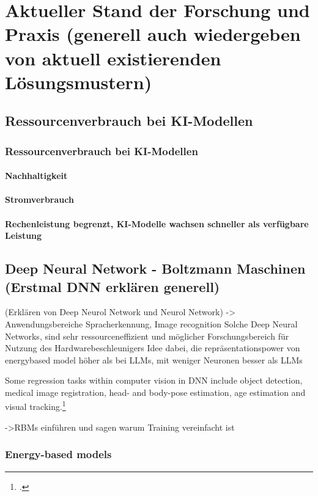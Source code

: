 \chapter{Aktueller Stand der Forschung und Praxis (generell auch wiedergeben von aktuell existierenden Lösungsmustern)}

\section{Ressourcenverbrauch bei KI-Modellen}
\subsection{Ressourcenverbrauch bei KI-Modellen}
\subsubsection{Nachhaltigkeit}
\subsubsection{Stromverbrauch}
\subsubsection{Rechenleistung begrenzt, KI-Modelle wachsen schneller als verfügbare Leistung}

\section{Deep Neural Network - Boltzmann Maschinen (Erstmal DNN erklären generell)}

(Erklären von Deep Neurol Network und Neurol Network) -> Anwendungsbereiche Spracherkennung, Image recognition
Solche Deep Neural Networks, sind sehr ressourceneffizient und möglicher Forschungsbereich für Nutzung des Hardwarebeschleunigers
Idee dabei, die repräsentationspower von energybased model höher als bei LLMs, mit weniger Neuronen besser als LLMs 


Some regression tasks within computer vision in \ac{DNN} include object detection, medical image registration, head- and body-pose estimation, age estimation and visual tracking.\footcite[Vgl.][325-326]{gustafssonEnergyBasedModelsDeep2020}

->RBMs einführen und sagen warum Training vereinfacht ist

\subsection{Energy-based models}


